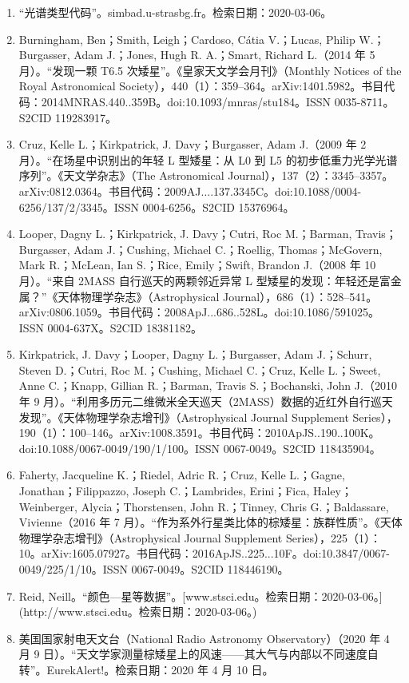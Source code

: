 \begin{enumerate}
\item “光谱类型代码”。simbad.u-strasbg.fr。检索日期：2020-03-06。
\item Burningham, Ben；Smith, Leigh；Cardoso, Cátia V.；Lucas, Philip W.；Burgasser, Adam J.；Jones, Hugh R. A.；Smart, Richard L.（2014 年 5 月）。“发现一颗 T6.5 次矮星”。《皇家天文学会月刊》（Monthly Notices of the Royal Astronomical Society），440（1）：359–364。arXiv:1401.5982。书目代码：2014MNRAS.440..359B。doi:10.1093/mnras/stu184。ISSN 0035-8711。S2CID 119283917。
\item Cruz, Kelle L.；Kirkpatrick, J. Davy；Burgasser, Adam J.（2009 年 2 月）。“在场星中识别出的年轻 L 型矮星：从 L0 到 L5 的初步低重力光学光谱序列”。《天文学杂志》（The Astronomical Journal），137（2）：3345–3357。arXiv:0812.0364。书目代码：2009AJ....137.3345C。doi:10.1088/0004-6256/137/2/3345。ISSN 0004-6256。S2CID 15376964。
\item Looper, Dagny L.；Kirkpatrick, J. Davy；Cutri, Roc M.；Barman, Travis；Burgasser, Adam J.；Cushing, Michael C.；Roellig, Thomas；McGovern, Mark R.；McLean, Ian S.；Rice, Emily；Swift, Brandon J.（2008 年 10 月）。“来自 2MASS 自行巡天的两颗邻近异常 L 型矮星的发现：年轻还是富金属？”《天体物理学杂志》（Astrophysical Journal），686（1）：528–541。arXiv:0806.1059。书目代码：2008ApJ...686..528L。doi:10.1086/591025。ISSN 0004-637X。S2CID 18381182。
\item Kirkpatrick, J. Davy；Looper, Dagny L.；Burgasser, Adam J.；Schurr, Steven D.；Cutri, Roc M.；Cushing, Michael C.；Cruz, Kelle L.；Sweet, Anne C.；Knapp, Gillian R.；Barman, Travis S.；Bochanski, John J.（2010 年 9 月）。“利用多历元二维微米全天巡天（2MASS）数据的近红外自行巡天发现”。《天体物理学杂志增刊》（Astrophysical Journal Supplement Series），190（1）：100–146。arXiv:1008.3591。书目代码：2010ApJS..190..100K。doi:10.1088/0067-0049/190/1/100。ISSN 0067-0049。S2CID 118435904。
\item Faherty, Jacqueline K.；Riedel, Adric R.；Cruz, Kelle L.；Gagne, Jonathan；Filippazzo, Joseph C.；Lambrides, Erini；Fica, Haley；Weinberger, Alycia；Thorstensen, John R.；Tinney, Chris G.；Baldassare, Vivienne（2016 年 7 月）。“作为系外行星类比体的棕矮星：族群性质”。《天体物理学杂志增刊》（Astrophysical Journal Supplement Series），225（1）：10。arXiv:1605.07927。书目代码：2016ApJS..225...10F。doi:10.3847/0067-0049/225/1/10。ISSN 0067-0049。S2CID 118446190。
\item Reid, Neill。“颜色—星等数据”。[www.stsci.edu。检索日期：2020-03-06。](http://www.stsci.edu。检索日期：2020-03-06。)
\item 美国国家射电天文台（National Radio Astronomy Observatory）（2020 年 4 月 9 日）。“天文学家测量棕矮星上的风速——其大气与内部以不同速度自转”。EurekAlert!。检索日期：2020 年 4 月 10 日。

\end{enumerate}
